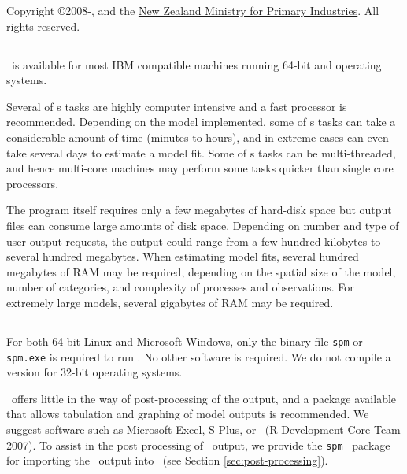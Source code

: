 Copyright \copyright 2008-\SourceControlYearDoc, \href{http://www.niwa.co.nz}{\Organisation} and the \href{http://www.mpi.govt.nz}{New Zealand Ministry for Primary Industries}. All rights reserved.

\subsection{}

\SPM\ is available for most IBM compatible machines running 64-bit  and  operating systems.

Several of \SPM s tasks are highly computer intensive and a fast processor is recommended. Depending on the model implemented, some of \SPM s tasks can take a considerable amount of time (minutes to hours), and in extreme cases can even take several days to estimate a model fit. Some of \SPM s tasks can be multi-threaded, and hence multi-core machines may perform some tasks quicker than single core processors.

The program itself requires only a few megabytes of hard-disk space but output files can consume large amounts of disk space. Depending on number and type of user output requests, the output could range from a few hundred kilobytes to several hundred megabytes. When estimating model fits, several hundred megabytes of RAM may be required, depending on the spatial size of the model, number of categories, and complexity of processes and observations. For extremely large models, several gigabytes of RAM may be required. 

\subsection{}

For both 64-bit Linux and Microsoft Windows, only the binary file \texttt{spm} or \texttt{spm.exe} is required to run \SPM . No other software is required. We do not compile a version for 32-bit operating systems. 

\SPM\ offers little in the way of  post-processing of the output, and a package available that allows tabulation and graphing of model outputs is recommended. We suggest software such as \href{http://www.microsoft.com}{Microsoft Excel}, \href{http://www.insightful.com}{S-Plus}, or \href{http://www.r-project.org}{\R}\ (R Development Core Team 2007). To assist in the post processing of \SPM\ output, we provide the \texttt{spm} \R\ package for importing the \SPM\ output into \R\ (see Section \ref{sec:post-processing}).

